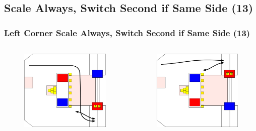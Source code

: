 \documentclass{beamer}
\begin{document}
\subsection{Scale Always, Switch Second if Same Side (13)}

\begin{frame}
 \frametitle{Left Corner Scale Always, Switch Second if Same Side \alert{(13)}}
 \begin{columns}
  \begin{figure}
   \includegraphics[scale=0.15]{assets/paths/13_LR}
  \end{figure}
  \begin{figure}
   \includegraphics[scale=0.15]{assets/paths/13_RL}

\end{figure}
\end{columns}
\end{frame}
\end{document}
